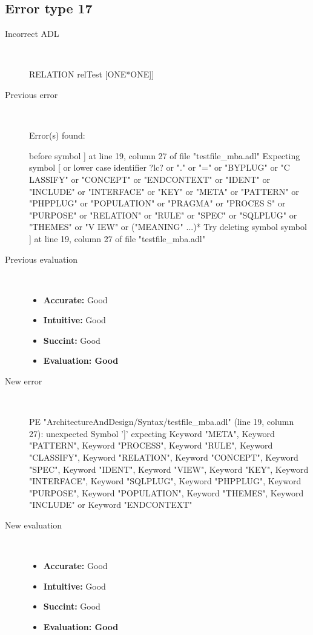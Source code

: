\subsection{Error type 17}
  \begin{description}
  \item[Incorrect ADL]~\\
\begin{adl}
RELATION relTest [ONE*ONE]]\end{adl}
  \item[Previous error]~\\
\begin{haskell}
Error(s) found:

before symbol ] at line 19, column 27 of file "testfile_mba.adl"
Expecting symbol [ or lower case identifier ?lc? or "." or "=" or "BYPLUG" or "C
LASSIFY" or "CONCEPT" or "ENDCONTEXT" or "IDENT" or "INCLUDE" or "INTERFACE" or
"KEY" or "META" or "PATTERN" or "PHPPLUG" or "POPULATION" or "PRAGMA" or "PROCES
S" or "PURPOSE" or "RELATION" or "RULE" or "SPEC" or "SQLPLUG" or "THEMES" or "V
IEW" or ("MEANING" ...)*
Try deleting symbol symbol ] at line 19, column 27 of file "testfile_mba.adl"\end{haskell}
  \item[Previous evaluation]~\\
    \begin{itemize}
    \item \textbf{Accurate:} Good
    \item \textbf{Intuitive:} Good
    \item \textbf{Succint:} Good
    \item \textbf{Evaluation: Good}
    \end{itemize}
  \item[New error]~\\
\begin{haskell}
PE "ArchitectureAndDesign/Syntax/testfile_mba.adl" (line 19, column 27):
unexpected Symbol ']'
expecting Keyword "META", Keyword "PATTERN", Keyword "PROCESS", Keyword "RULE", Keyword "CLASSIFY", Keyword "RELATION", Keyword "CONCEPT", Keyword "SPEC", Keyword "IDENT", Keyword "VIEW", Keyword "KEY", Keyword "INTERFACE", Keyword "SQLPLUG", Keyword "PHPPLUG", Keyword "PURPOSE", Keyword "POPULATION", Keyword "THEMES", Keyword "INCLUDE" or Keyword "ENDCONTEXT"
\end{haskell}
  \item[New evaluation]~\\
    \begin{itemize}
    \item \textbf{Accurate:} Good
    \item \textbf{Intuitive:} Good
    \item \textbf{Succint:} Good
    \item \textbf{Evaluation: Good
}
    \end{itemize}
  \end{description}

